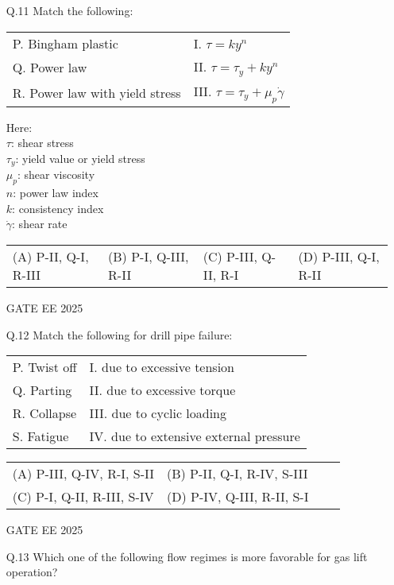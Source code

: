 \documentclass{article}
\begin{document}
\begin{enumerate}[leftmargin=*]
\setcounter{enumi}{10} %

\item[Q.11] Match the following:

\begin{tabular}{ll}
P. Bingham plastic & I. $\tau = ky^n$ \\
Q. Power law & II. $\tau = \tau_y + ky^n$ \\
R. Power law with yield stress & III. $\tau = \tau_y + \mu_p \dot{\gamma}$ \\
\end{tabular}

Here: \\
$\tau$: shear stress \\
$\tau_y$: yield value or yield stress \\
$\mu_p$: shear viscosity \\
$n$: power law index \\
$k$: consistency index \\
$\dot{\gamma}$: shear rate \\

\begin{tabular}{llll}
(A) P-II, Q-I, R-III & (B) P-I, Q-III, R-II & (C) P-III, Q-II, R-I & (D) P-III, Q-I, R-II
\end{tabular}
GATE EE 2025
 \vspace{0.5cm} 
\item[Q.12] Match the following for drill pipe failure:

\begin{tabular}{ll}
P. Twist off & I. due to excessive tension \\
Q. Parting & II. due to excessive torque \\
R. Collapse & III. due to cyclic loading \\
S. Fatigue & IV. due to extensive external pressure \\
\end{tabular}

\begin{tabular}{llll}
(A) P-III, Q-IV, R-I, S-II & (B) P-II, Q-I, R-IV, S-III \\
(C) P-I, Q-II, R-III, S-IV & (D) P-IV, Q-III, R-II, S-I
\end{tabular}

GATE EE 2025
 \vspace{0.5cm} 
\item[Q.13] Which one of the following flow regimes is more favorable for gas lift operation?


\end{enumerate}
\end{document}
